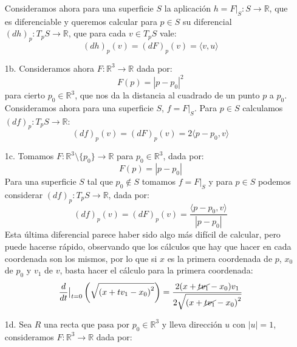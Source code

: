 \begin{ejemplo}
\begin{enumerate}
            Consideramos ahora para una superficie $S$ la aplicación $h=F\big|_S:S\to \mathbb{R}$, que es diferenciable y queremos calcular para $p\in S$ su diferencial $(dh)_p:T_pS\to \mathbb{R}$, que para cada $v\in T_pS$ vale:
            \begin{equation*}
                (dh)_p(v) = (dF)_p(v) = \langle v,u \rangle 
            \end{equation*}
        \item[1b.] Consideramos ahora $F:\mathbb{R}^3\to\mathbb{R}$ dada por:
            \begin{equation*}
                F(p) = |p-p_0|^2
            \end{equation*}
            para cierto $p_0\in \mathbb{R}^3$, que nos da la distancia al cuadrado de un punto $p$ a $p_0$. Consideramos ahora para una superficie $S$, $f=F\big|_S$. Para $p\in S$ calculamos $(d f)_p:T_pS\to \mathbb{R}$:
            \begin{equation*}
                (df)_p(v) = (dF)_p(v) = 2\langle p-p_0,v \rangle 
            \end{equation*}
        \item[1c.] Tomamos $F:\mathbb{R}^3\setminus \{p_0\}\to\mathbb{R}$ para $p_0\in \mathbb{R}^3$, dada por:
            \begin{equation*}
                F(p) = |p-p_0|
            \end{equation*}
            Para una superficie $S$ tal que $p_0\notin S$ tomamos $f=F\big|_S$ y para $p\in S$ podemos considerar $(d f)_p:T_pS\to \mathbb{R}$, dada por:
            \begin{equation*}
                (d f)_p(v) = (dF)_p(v) = \frac{\langle p-p_0,v \rangle }{|p-p_0|}
            \end{equation*}
            Esta última diferencial parece haber sido algo más difícil de calcular, pero puede hacerse rápido, observando que los cálculos que hay que hacer en cada coordenada son los mismos, por lo que si $x$ es la primera coordenada de $p$, $x_0$ de $p_0$ y $v_1$ de $v$, basta hacer el cálculo para la primera coordenada:
            \begin{equation*}
                \frac{d}{dt}\big|_{t=0} \left(\sqrt{{(x+tv_1-x_0)}^{2}}\right) = \frac{2(x+\cancel{tv_1}-x_0)v_1}{2\sqrt{{(x+\cancel{tv_1}-x_0)}^{2}}}
            \end{equation*}
        \item[1d.] Sea $R$ una recta que pasa por $p_0\in \mathbb{R}^3$ y lleva dirección $u$ con $|u| =1$, consideramos $F:\mathbb{R}^3\to \mathbb{R}$ dada por:

\end{enumerate}
\end{ejemplo}
